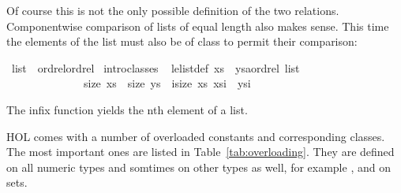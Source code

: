 %
\begin{isabellebody}%
\def\isabellecontext{Overloading{\isadigit{2}}}%
%
\begin{isamarkuptext}%
Of course this is not the only possible definition of the two relations.
Componentwise comparison of lists of equal length also makes sense. This time
the elements of the list must also be of class  to permit their
comparison:%
\end{isamarkuptext}%
\ list\ {\isacharcolon}{\isacharcolon}\ {\isacharparenleft}ordrel{\isacharparenright}ordrel\isanewline
{}\ intro{\isacharunderscore}classes\isanewline
\isanewline
{}\ {\isacharparenleft}\isanewline
le{\isacharunderscore}list{\isacharunderscore}def{\isacharcolon}\ {\isachardoublequote}xs\ {\isacharless}{\isacharless}{\isacharequal}\ {\isacharparenleft}ys{\isacharcolon}{\isacharcolon}{\isacharprime}a{\isacharcolon}{\isacharcolon}ordrel\ list{\isacharparenright}\ {\isasymequiv}\isanewline
\ \ \ \ \ \ \ \ \ \ \ \ \ \ size\ xs\ {\isacharequal}\ size\ ys\ {\isasymand}\ {\isacharparenleft}{\isasymforall}i{\isacharless}size\ xs{\isachardot}\ xs{\isacharbang}i\ {\isacharless}{\isacharless}{\isacharequal}\ ys{\isacharbang}i{\isacharparenright}{\isachardoublequote}%
\begin{isamarkuptext}%
\noindent
The infix function \isa{{\isacharbang}} yields the nth element of a list.%
\end{isamarkuptext}%
%
%
\begin{isamarkuptext}%
HOL comes with a number of overloaded constants and corresponding classes.
The most important ones are listed in Table~\ref{tab:overloading}. They are
defined on all numeric types and somtimes on other types as well, for example
\isa{{\isacharminus}}, \isa{{\isasymle}} and \isa{{\isacharless}} on sets.


\end{isamarkuptext}
\end{isabellebody}
